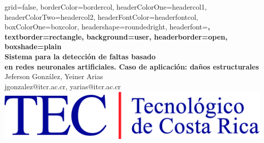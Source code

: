 \documentclass[a0paper,portrait]{baposter}
\begin{document}
\begin{poster}{
grid=false,
borderColor=bordercol, %
headerColorOne=headercol1, %
headerColorTwo=headercol2, %
headerFontColor=headerfontcol, %
boxColorOne=boxcolor, %
headershape=roundedright, %
headerfont=\Large\sf\bf, %
textborder=rectangle,
background=user,
headerborder=open, %
boxshade=plain
}
{}
%
%
{\sf\bf \\ Sistema para la detección de faltas basado\\ en redes neuronales artificiales. Caso de aplicación: daños estructurales} %
{\vspace{0.5em} Jeferson González, Yeiner Arias\\ %
{\smaller jgonzalez@itcr.ac.cr, yarias@itcr.ac.cr}} %
{\includegraphics[scale=0.6]{logo}} %


\end{poster}
\end{document}
